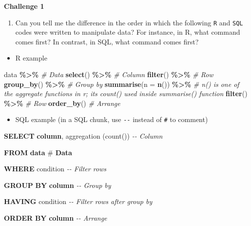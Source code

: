 \documentclass[
]{book}
\newenvironment{Shaded}{\begin{snugshade}}{\end{snugshade}}
\newcommand{\CommentTok}[1]{\textcolor[rgb]{0.56,0.35,0.01}{\textit{#1}}}
\newcommand{\DataTypeTok}[1]{\textcolor[rgb]{0.13,0.29,0.53}{#1}}
\newcommand{\FunctionTok}[1]{\textcolor[rgb]{0.00,0.00,0.00}{#1}}
\newcommand{\KeywordTok}[1]{\textcolor[rgb]{0.13,0.29,0.53}{\textbf{#1}}}
\newcommand{\NormalTok}[1]{#1}
\newcommand{\OperatorTok}[1]{\textcolor[rgb]{0.81,0.36,0.00}{\textbf{#1}}}
\newcommand{\StringTok}[1]{\textcolor[rgb]{0.31,0.60,0.02}{#1}}
\providecommand{\tightlist}{%
  \setlength{\itemsep}{0pt}\setlength{\parskip}{0pt}}
\begin{document}
\textbf{Challenge 1}

\begin{enumerate}
\def\labelenumi{\arabic{enumi}.}
\tightlist
\item
  Can you tell me the difference in the order in which the following \texttt{R} and \texttt{SQL} codes were written to manipulate data? For instance, in R, what command comes first? In contrast, in SQL, what command comes first?
\end{enumerate}

\begin{itemize}
\tightlist
\item
  R example
\end{itemize}

\begin{Shaded}
\begin{Highlighting}[]

\NormalTok{data }\OperatorTok{\%\textgreater{}\%}\StringTok{ }\CommentTok{\# Data }
\StringTok{  }\KeywordTok{select}\NormalTok{() }\OperatorTok{\%\textgreater{}\%}\StringTok{ }\CommentTok{\# Column}
\StringTok{  }\KeywordTok{filter}\NormalTok{() }\OperatorTok{\%\textgreater{}\%}\StringTok{ }\CommentTok{\# Row }
\StringTok{  }\KeywordTok{group\_by}\NormalTok{() }\OperatorTok{\%\textgreater{}\%}\StringTok{ }\CommentTok{\# Group by }
\StringTok{  }\KeywordTok{summarise}\NormalTok{(}\DataTypeTok{n =} \KeywordTok{n}\NormalTok{()) }\OperatorTok{\%\textgreater{}\%}\StringTok{ }\CommentTok{\# n() is one of the aggregate functions in r; it\textquotesingle{}s count() used inside summarise() function }
\StringTok{  }\KeywordTok{filter}\NormalTok{() }\OperatorTok{\%\textgreater{}\%}\StringTok{ }\CommentTok{\# Row }
\StringTok{  }\KeywordTok{order\_by}\NormalTok{() }\CommentTok{\# Arrange }
\end{Highlighting}
\end{Shaded}

\begin{itemize}
\tightlist
\item
  SQL example (in a SQL chunk, use \texttt{-\/-} instead of \texttt{\#} to comment)
\end{itemize}

\begin{Shaded}
\begin{Highlighting}[]

\KeywordTok{SELECT} \KeywordTok{column}\NormalTok{, aggregation (}\FunctionTok{count}\NormalTok{())\textasciigrave{} }\CommentTok{{-}{-} Column}

\KeywordTok{FROM} \KeywordTok{data}\NormalTok{ \# }\KeywordTok{Data} 

\KeywordTok{WHERE}\NormalTok{ condition }\CommentTok{{-}{-} Filter rows }

\KeywordTok{GROUP} \KeywordTok{BY} \KeywordTok{column} \CommentTok{{-}{-} Group by}

\KeywordTok{HAVING}\NormalTok{ condition }\CommentTok{{-}{-} Filter rows after group by  }

\KeywordTok{ORDER} \KeywordTok{BY} \KeywordTok{column} \CommentTok{{-}{-} Arrange }
\end{Highlighting}
\end{Shaded}
\end{document}
